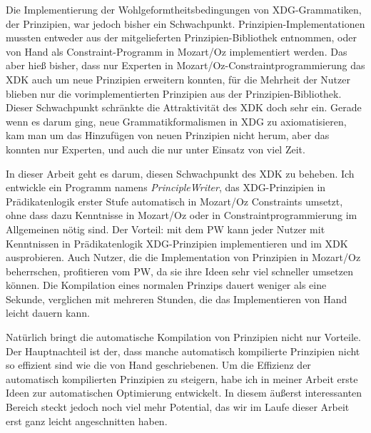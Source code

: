 Die Implementierung der Wohlgeformtheitsbedingungen von
XDG-Grammatiken, der Prinzipien, war jedoch bisher ein
Schwachpunkt. Prinzipien-Implementationen mussten entweder aus der
mitgelieferten Prinzipien-Bibliothek entnommen, oder von Hand als
Constraint-Programm in Mozart/Oz implementiert werden. Das aber
hie{\ss} bisher, dass nur Experten in
Mozart/Oz-Constraintprogrammierung das XDK auch um neue Prinzipien
erweitern konnten, f{\"u}r die Mehrheit der Nutzer blieben nur die
vorimplementierten Prinzipien aus der Prinzipien-Bibliothek. Dieser
Schwachpunkt schr{\"a}nkte die Attraktivit{\"a}t des XDK doch sehr
ein. Gerade wenn es darum ging, neue Grammatikformalismen in XDG zu
axiomatisieren, kam man um das Hinzuf{\"u}gen von neuen Prinzipien
nicht herum, aber das konnten nur Experten, und auch die nur unter
Einsatz von viel Zeit.

In dieser Arbeit geht es darum, diesen Schwachpunkt des XDK zu
beheben. Ich entwickle ein Programm namens \emph{PrincipleWriter}, das
XDG-Prinzipien in Pr{\"a}dikatenlogik erster Stufe automatisch in
Mozart/Oz Constraints umsetzt, ohne dass dazu Kenntnisse in Mozart/Oz
oder in Constraintprogrammierung im Allgemeinen n{\"o}tig sind. Der
Vorteil: mit dem PW kann jeder Nutzer mit Kenntnissen in
Pr{\"a}dikatenlogik XDG-Prinzipien implementieren und im XDK
ausprobieren. Auch Nutzer, die die Implementation von Prinzipien in
Mozart/Oz beherrschen, profitieren vom PW, da sie ihre Ideen sehr viel
schneller umsetzen k{\"o}nnen. Die Kompilation eines normalen Prinzips
dauert weniger als eine Sekunde, verglichen mit mehreren Stunden, die
das Implementieren von Hand leicht dauern kann.

Nat{\"u}rlich bringt die automatische Kompilation von Prinzipien nicht
nur Vorteile. Der Hauptnachteil ist der, dass manche automatisch
kompilierte Prinzipien nicht so effizient sind wie die von Hand
geschriebenen. Um die Effizienz der automatisch kompilierten
Prinzipien zu steigern, habe ich in meiner Arbeit erste Ideen zur
automatischen Optimierung entwickelt. In diesem {\"a}u{\ss}erst
interessanten Bereich steckt jedoch noch viel mehr Potential, das wir
im Laufe dieser Arbeit erst ganz leicht angeschnitten haben.

